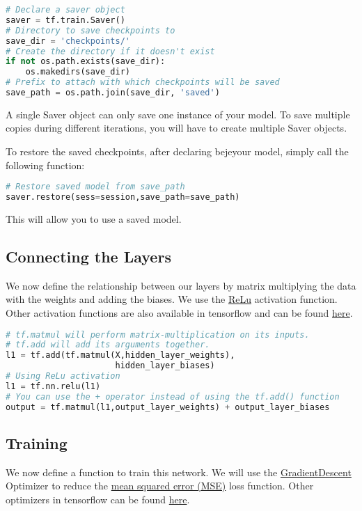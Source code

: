 \documentclass[Proceedings]{ascelike}
\begin{document}
\begin{lstlisting}[language=Python]
# Declare a saver object
saver = tf.train.Saver()
# Directory to save checkpoints to
save_dir = 'checkpoints/'
# Create the directory if it doesn't exist
if not os.path.exists(save_dir):
    os.makedirs(save_dir)
# Prefix to attach with which checkpoints will be saved
save_path = os.path.join(save_dir, 'saved')
\end{lstlisting}

A single Saver object can only save one instance of your model. To save multiple copies during different iterations, you will have to create multiple Saver objects.

To restore the saved checkpoints, after declaring bejeyour model, simply call the following function:

\begin{lstlisting}[language=Python]
# Restore saved model from save_path
saver.restore(sess=session,save_path=save_path)
\end{lstlisting}

This will allow you to use a saved model.


\subsection{Connecting the Layers}
We now define the relationship between our layers by matrix multiplying the data with the weights and adding the biases. We use the \href{https://en.wikipedia.org/wiki/Rectifier_(neural_networks)}{ReLu} activation function. Other activation functions are also available in tensorflow and can be found \href{https://www.tensorflow.org/api_guides/python/nn}{here}.

\begin{lstlisting}[language=Python]
# tf.matmul will perform matrix-multiplication on its inputs.
# tf.add will add its arguments together.
l1 = tf.add(tf.matmul(X,hidden_layer_weights), 
                      hidden_layer_biases)
# Using ReLu activation
l1 = tf.nn.relu(l1)
# You can use the + operator instead of using the tf.add() function
output = tf.matmul(l1,output_layer_weights) + output_layer_biases
\end{lstlisting}

\subsection{Training}
We now define a function to train this network. We will use the \href{https://en.wikipedia.org/wiki/Gradient_descent}{GradientDescent} Optimizer to reduce the \href{https://en.wikipedia.org/wiki/Mean_squared_error}{mean squared error (MSE)} loss function. Other optimizers in tensorflow can be found \href{https://www.tensorflow.org/api_guides/python/train#Optimizers}{here}.
\end{document}
